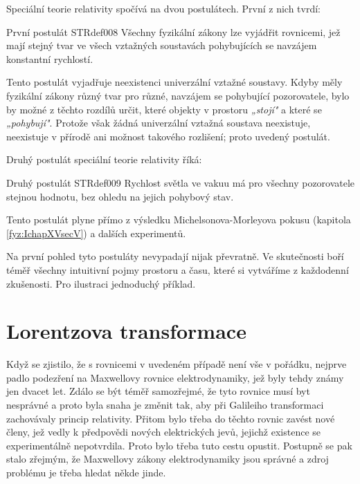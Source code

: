       Speciální teorie relativity spočívá na dvou postulátech. První z nich tvrdí: 
      \begin{fyzdef}{První postulát STR}{def008}
        Všechny fyzikální zákony lze vyjádřit rovnicemi, jež mají stejný tvar ve všech vztažných
        soustavách pohybujících se navzájem konstantní rychlostí. 
      \end{fyzdef}
      Tento postulát vyjadřuje neexistenci univerzální vztažné soustavy. Kdyby měly fyzikální zákony
      různý tvar pro různé, navzájem se pohybující pozorovatele, bylo by možné z těchto rozdílů
      určit, které objekty v prostoru \emph{„stojí"} a které se \emph{„pohybují"}. Protože však
      žádná univerzální vztažná soustava neexistuje, neexistuje v přírodě ani možnost takového
      rozlišení; proto uvedený postulát.

      Druhý postulát speciální teorie relativity říká:
      \begin{fyzdef}{Druhý postulát STR}{def009}
        Rychlost světla ve vakuu má pro všechny pozorovatele stejnou hodnotu, bez ohledu na jejich 
        pohybový stav. 
      \end{fyzdef}
      Tento postulát plyne přímo z výsledku Michelsonova-Morleyova pokusu (kapitola
      \ref{fyz:IchapXVsecV}) a dalších experimentů.

      Na první pohled tyto postuláty nevypadají nijak převratně. Ve skutečnosti boří téměř všechny
      intuitivní pojmy prostoru a času, které si vytváříme z každodenní zkušenosti. Pro ilustraci
      jednoduchý příklad. 
      

    
  \section{Lorentzova transformace}\label{fyz:IchapXVsecIV}
    Když se zjistilo, že s rovnicemi v uvedeném případě není vše v pořádku, nejprve padlo podezření 
    na Maxwellovy rovnice elektrodynamiky, jež byly tehdy známy jen dvacet let. Zdálo se být téměř 
    samozřejmé, že tyto rovnice musí byt nesprávné a proto byla snaha je změnit tak, aby při 
    Galileiho transformaci zachovávaly princip relativity. Přitom bylo třeba do těchto rovnic 
    zavést nové členy, jež vedly k předpovědi nových elektrických jevů, jejichž existence se 
    experimentálně nepotvrdila. Proto bylo třeba tuto cestu opustit. Postupně se pak stalo zřejmým, 
    že Maxwellovy zákony elektrodynamiky jsou správné a zdroj problému je třeba hledat někde 
    jinde.  
    
